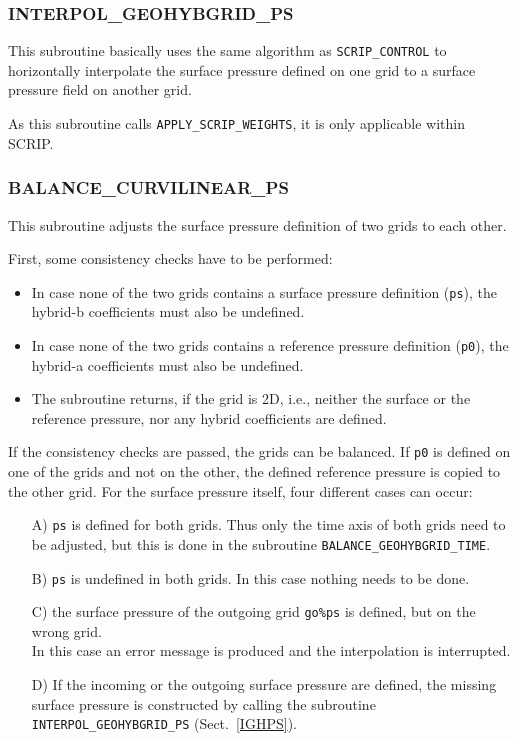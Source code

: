 \documentclass[11pt,twoside]{article}
\begin{document}
\subsubsection{INTERPOL\_GEOHYBGRID\_PS\label{IGHPS}}
This subroutine basically uses the same algorithm as \verb|SCRIP_CONTROL| to
horizontally interpolate the surface pressure defined on one grid to a surface
pressure field on another grid.

As this subroutine calls \verb|APPLY_SCRIP_WEIGHTS|, it is only
applicable within SCRIP. 

\subsubsection{BALANCE\_CURVILINEAR\_PS\label{BALCLPS}}
This subroutine  adjusts the surface pressure definition of two grids to each
other. 

First, some consistency checks have to be performed:
\begin{itemize}
\item In case none of the two grids contains a surface pressure
definition (\verb|ps|),
 the hybrid-b coefficients must also be undefined.
\item In case none of the two grids contains a reference pressure
 definition (\verb|p0|),
 the hybrid-a coefficients must also be undefined.
\item The subroutine returns, if the grid is 2D, i.e., neither
the surface or the reference pressure, nor any hybrid coefficients are defined.
\end{itemize}

If the consistency checks are passed, the grids can be balanced.
If \verb|p0| is defined on one of the grids and not on the other, the defined
reference pressure is copied to the other grid.
For the surface pressure itself, four different cases can occur:
\begin{enumerate}
\item[A)] \verb|ps| is defined for both grids. Thus only the time axis of both
grids need to be adjusted, but this is done in the
subroutine \verb|BALANCE_GEOHYBGRID_TIME|. 
\item[B)] \verb|ps| is undefined in both grids. In this case nothing
needs to be done.
\item[C)] the surface pressure of the outgoing grid \verb|go%ps| is defined,
but on the wrong grid. \\
In this case an error message is produced and the interpolation is
interrupted.
\item[D)] If the incoming or the outgoing surface pressure are defined, the
missing surface pressure is constructed by calling the
subroutine \verb|INTERPOL_GEOHYBGRID_PS| (Sect.~\ref{IGHPS}). 
\end{enumerate}
\end{document}
